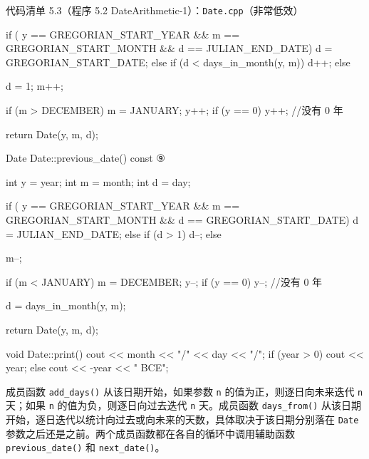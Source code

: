 \begin{codeboxt}{代码清单 5.3（程序 5.2 DateArithmetic-1）：\texttt{Date.cpp}（非常低效）}
{    if (   y == GREGORIAN_START_YEAR
        && m == GREGORIAN_START_MONTH
        && d == JULIAN_END_DATE)      d = GREGORIAN_START_DATE;
    else if (d < days_in_month(y, m)) d++;
    else
    {
        d = 1;
        m++;

        if (m > DECEMBER)
        {
            m = JANUARY;
            y++;
            if (y == 0) y++;  //没有 0 年
        }
    }

    return Date(y, m, d);
}

Date Date::previous_date() const                  ⑨
{
    int y = year;
    int m = month;
    int d = day;

    if (   y == GREGORIAN_START_YEAR
        && m == GREGORIAN_START_MONTH
        && d == GREGORIAN_START_DATE) d = JULIAN_END_DATE;
    else if (d > 1)                   d--;
    else
    {
        m--;

        if (m < JANUARY)
        {
            m = DECEMBER;
            y--;
            if (y == 0) y--;  //没有 0 年
        }

        d = days_in_month(y, m);
    }

    return Date(y, m, d);
}

void Date::print()
{
    cout << month << "/" << day << "/";
    if (year > 0) cout <<  year;
    else          cout << -year << " BCE";
}
\end{codeboxt}
\par
{}\par
{}\par
{}\par
{}\par
{}\par
{}\par
{}\par
{}\par

成员函数 \texttt{add\_\allowbreak{}days(\allowbreak{})\allowbreak{}} 从该日期开始，如果参数 \texttt{n} 的值为正，则逐日向未来迭代 \texttt{n} 天；如果 \texttt{n} 的值为负，则逐日向过去迭代 \texttt{n} 天。成员函数 \texttt{days\_\allowbreak{}from(\allowbreak{})\allowbreak{}} 从该日期开始，逐日迭代以统计向过去或向未来的天数，具体取决于该日期分别落在 \texttt{Date} 参数之后还是之前。两个成员函数都在各自的循环中调用辅助函数 \texttt{previous\_\allowbreak{}date(\allowbreak{})\allowbreak{}} 和 \texttt{next\_\allowbreak{}date(\allowbreak{})\allowbreak{}}。

